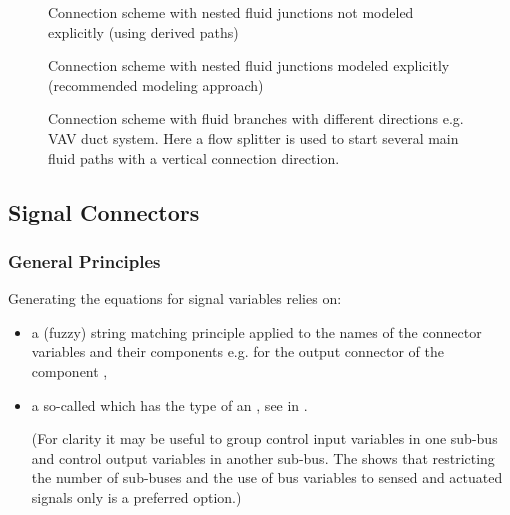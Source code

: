 \documentclass[letterpaper,10pt, openany,english]{sphinxmanual}
\begin{document}
\begin{figure}[htbp]
\centering
\capstart

\noindent{}
\caption{Connection scheme with nested fluid junctions not modeled explicitly (using derived paths)}\label{\detokenize{requirements:linkage-connect-multi}}\end{figure}

\begin{figure}[htbp]
\centering
\capstart

\noindent{}
\caption{Connection scheme with nested fluid junctions modeled explicitly (recommended modeling approach)}\label{\detokenize{requirements:linkage-connect-multi-exp}}\end{figure}

\begin{figure}[htbp]
\centering
\capstart

\noindent{}
\caption{Connection scheme with fluid branches with different directions e.g. VAV duct system. Here a flow splitter is used to start several main fluid paths with a vertical connection direction.}\label{\detokenize{requirements:linkage-connect-duct}}\end{figure}


\subsection{Signal Connectors}
\label{\detokenize{requirements:signal-connectors}}\label{\detokenize{requirements:sec-signal-connectors}}

\subsubsection{General Principles}
\label{\detokenize{requirements:general-principles}}
Generating the  equations for signal variables relies on:
\begin{itemize}
\item {} 
a (fuzzy) string matching principle applied to the names of the connector variables and their components e.g.  for the output connector  of the component ,

\item {} 
a so-called  which has the type of an , see  in .

(For clarity it may be useful to group control input variables in one sub-bus and control output variables in another sub-bus. The  shows that restricting the number of sub-buses and the use of bus variables to sensed and actuated signals only is a preferred option.)

\end{itemize}
\end{document}

